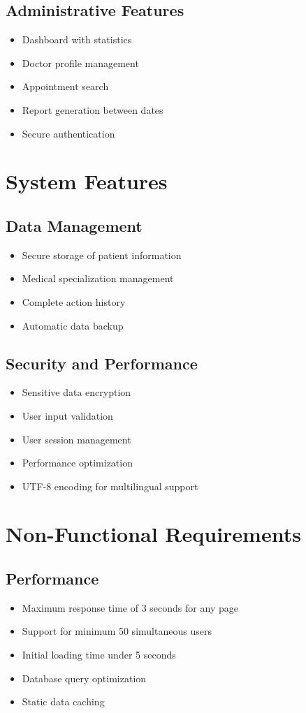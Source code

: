 \documentclass[12pt,a4paper]{report}
\begin{document}
\subsection{Administrative Features}
\begin{itemize}
    \item Dashboard with statistics
    \item Doctor profile management
    \item Appointment search
    \item Report generation between dates
    \item Secure authentication
\end{itemize}

\section{System Features}

\subsection{Data Management}
\begin{itemize}
    \item Secure storage of patient information
    \item Medical specialization management
    \item Complete action history
    \item Automatic data backup
\end{itemize}

\subsection{Security and Performance}
\begin{itemize}
    \item Sensitive data encryption
    \item User input validation
    \item User session management
    \item Performance optimization
    \item UTF-8 encoding for multilingual support
\end{itemize}

\section{Non-Functional Requirements}

\subsection{Performance}
\begin{itemize}
    \item Maximum response time of 3 seconds for any page
    \item Support for minimum 50 simultaneous users
    \item Initial loading time under 5 seconds
    \item Database query optimization
    \item Static data caching
\end{itemize}
\end{document}
